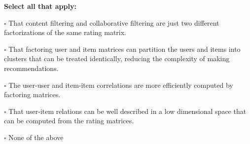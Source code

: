 \documentclass[11pt,addpoints,answers]{exam}
\begin{document}
\begin{questions}
\begin{parts}
    \textbf{Select all that apply:}
    
        \begin{list}{}
        \item $\square$ That content filtering and collaborative filtering are just two different factorizations of the same rating matrix.
        \item $\square$ That factoring user and item matrices can partition the users and items into clusters that can be treated identically, reducing the complexity of making recommendations.
        \item $\square$ The user-user and item-item correlations are more efficiently computed by factoring matrices.
        \item $\square$ That user-item relations can be well described in a low dimensional space that can be computed from the rating matrices.
        \item $\square$ None of the above
    \end{list}
    
    
    
    \clearpage
    
    \newpage

\end{parts}
\end{questions}
\end{document}
